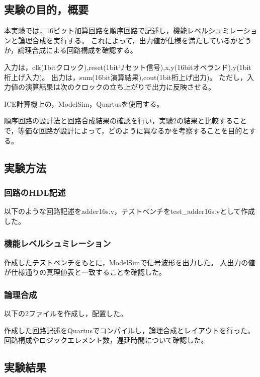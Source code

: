 
\subsection{実験の目的，概要}
本実験では，16ビット加算回路を順序回路で記述し，機能レベルシュミレーションと論理合成を実行する。
これによって，出力値が仕様を満たしているかどうか，論理合成による回路構成を確認する。

入力は，clk(1bitクロック),reset(1bitリセット信号),x,y(16bitオペランド),y(1bit桁上げ入力)。
出力は，sum(16bit演算結果),cout(1bit桁上げ出力)。
ただし，入力値の演算結果は次のクロックの立ち上がりで出力に反映させる。

ICE計算機上の，ModelSim，Quartusを使用する。

順序回路の設計法と回路合成結果の確認を行い，実験2の結果と比較することで，等価な回路が設計によって，どのように異なるかを考察することを目的とする。

\subsection{実験方法}
\subsubsection{回路のHDL記述}
以下のような回路記述をadder16s.v，テストベンチをtest\_adder16s.vとして作成した。



\subsubsection{機能レベルシュミレーション}
作成したテストベンチをもとに，ModelSimで信号波形を出力した。
入出力の値が仕様通りの真理値表と一致することを確認した。

\subsubsection{論理合成}
以下の2ファイルを作成し，配置した。



作成した回路記述をQuartusでコンパイルし，論理合成とレイアウトを行った。
回路構成やロジックエレメント数，遅延時間について確認した。
 
\subsection{実験結果}
